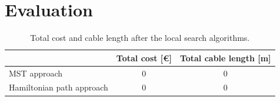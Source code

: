 \section{Evaluation}
\begin{table}
  \caption{Total cost and cable length after the local search algorithms.}
  \begin{center}
  \begin{tabular}{l|cc}
    & Total cost [\euro] & Total cable length [m] \\
    \toprule
    MST approach & 0 & 0 \\
    Hamiltonian path approach & 0 & 0\\
  \end{tabular}
  \end{center}
\end{table}
